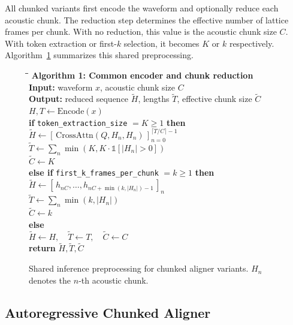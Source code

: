 \documentclass[conference]{IEEEtran}
\begin{document}
All chunked variants first encode the waveform and optionally reduce each
acoustic chunk. The reduction step determines the effective number of lattice
frames per chunk. With no reduction, this value is the acoustic chunk size $C$.
With token extraction or first-$k$ selection, it becomes $K$ or $k$ respectively.
Algorithm~\ref{alg:reduce} summarizes this shared preprocessing.

\begin{figure}[t]
\small
\begin{tabbing}
\hspace{0.03in}\=\hspace{0.20in}\=\hspace{0.20in}\=\kill
\textbf{Algorithm 1: Common encoder and chunk reduction}\\
\textbf{Input:} waveform $x$, acoustic chunk size $C$\\
\textbf{Output:} reduced sequence $\tilde{H}$, lengths $\tilde{T}$, effective chunk size $\tilde{C}$\\
$H,T \leftarrow \mathrm{Encode}(x)$\\
\textbf{if} \texttt{token\_extraction\_size} $=K \ge 1$ \textbf{then}\\
\> $\tilde{H} \leftarrow [\,\mathrm{CrossAttn}(Q,H_n,H_n)\,]_{n=0}^{\lceil T/C\rceil-1}$\\
\> $\tilde{T} \leftarrow \sum_n \min(K, K\cdot \mathbb{1}[|H_n|>0])$ \\
\> $\tilde{C} \leftarrow K$\\
\textbf{else if} \texttt{first\_k\_frames\_per\_chunk} $=k \ge 1$ \textbf{then}\\
\> $\tilde{H} \leftarrow [\,h_{nC},\ldots,h_{nC+\min(k,|H_n|)-1}\,]_n$\\
\> $\tilde{T} \leftarrow \sum_n \min(k, |H_n|)$\\
\> $\tilde{C} \leftarrow k$\\
\textbf{else}\\
\> $\tilde{H} \leftarrow H,\quad \tilde{T} \leftarrow T,\quad \tilde{C} \leftarrow C$\\
\textbf{return} $\tilde{H},\tilde{T},\tilde{C}$
\end{tabbing}
\caption{Shared inference preprocessing for chunked aligner variants. $H_n$
denotes the $n$-th acoustic chunk.}
\label{alg:reduce}
\end{figure}

\subsection{Autoregressive Chunked Aligner}
\end{document}
